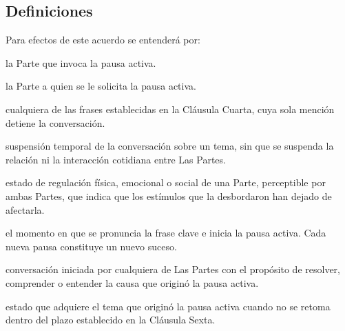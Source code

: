 \subsection*{Definiciones}

Para efectos de este acuerdo se entenderá por:

\begin{description}[leftmargin=0pt, itemsep=0.3em]
  \item[Parte solicitante:] la Parte que invoca la pausa activa.
  \item[Parte receptora:] la Parte a quien se le solicita la pausa activa.
  \item[Frase clave:] cualquiera de las frases establecidas en la Cláusula Cuarta, cuya sola mención detiene la conversación.
  \item[Pausa activa:] suspensión temporal de la conversación sobre un tema, sin que se suspenda la relación ni la interacción cotidiana entre Las Partes.
  \item[Estabilidad visible:] estado de regulación física, emocional o social de una Parte, perceptible por ambas Partes, que indica que los estímulos que la desbordaron han dejado de afectarla.
  \item[Suceso:] el momento en que se pronuncia la frase clave e inicia la pausa activa. Cada nueva pausa constituye un nuevo suceso.
  \item[Conversación de resolución:] conversación iniciada por cualquiera de Las Partes con el propósito de resolver, comprender o entender la causa que originó la pausa activa.
  \item[Conflicto solucionado:] estado que adquiere el tema que originó la pausa activa cuando no se retoma dentro del plazo establecido en la Cláusula Sexta.
\end{description}
